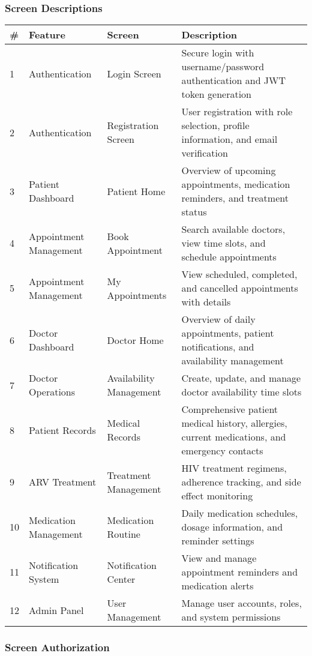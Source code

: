 \documentclass[12pt,a4paper]{article}
\begin{document}
\subsubsection{Screen Descriptions}

\begin{longtable}{|p{1cm}|p{3cm}|p{3cm}|p{7cm}|}
\hline
\textbf{\#} & \textbf{Feature} & \textbf{Screen} & \textbf{Description} \\
\hline
1 & Authentication & Login Screen & Secure login with username/password authentication and JWT token generation \\
\hline
2 & Authentication & Registration Screen & User registration with role selection, profile information, and email verification \\
\hline
3 & Patient Dashboard & Patient Home & Overview of upcoming appointments, medication reminders, and treatment status \\
\hline
4 & Appointment Management & Book Appointment & Search available doctors, view time slots, and schedule appointments \\
\hline
5 & Appointment Management & My Appointments & View scheduled, completed, and cancelled appointments with details \\
\hline
6 & Doctor Dashboard & Doctor Home & Overview of daily appointments, patient notifications, and availability management \\
\hline
7 & Doctor Operations & Availability Management & Create, update, and manage doctor availability time slots \\
\hline
8 & Patient Records & Medical Records & Comprehensive patient medical history, allergies, current medications, and emergency contacts \\
\hline
9 & ARV Treatment & Treatment Management & HIV treatment regimens, adherence tracking, and side effect monitoring \\
\hline
10 & Medication Management & Medication Routine & Daily medication schedules, dosage information, and reminder settings \\
\hline
11 & Notification System & Notification Center & View and manage appointment reminders and medication alerts \\
\hline
12 & Admin Panel & User Management & Manage user accounts, roles, and system permissions \\
\hline
\end{longtable}

\subsubsection{Screen Authorization}
\end{document}
